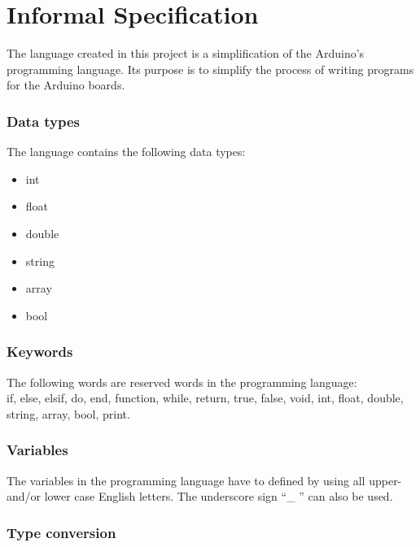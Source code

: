 \chapter{Informal Specification}\label{analysis:informal-specification}

The language created in this project is a simplification of the Arduino's programming language. Its purpose is to simplify the process of writing programs for the Arduino boards.   

\subsection{Data types}
The language contains the following data types: 
\begin{itemize}
\item int
\item float
\item double
\item string
\item array
\item bool
\end{itemize}

\subsection{Keywords}
The following words are reserved words in the programming language:\\
if, else, elsif, do, end, function, while, return, true, false, void, int, float, double, string, array, bool, print.

\subsection{Variables}
The variables in the programming language have to defined by using all upper- and/or lower case English letters. The underscore sign ``\_ '' can also be used. 

\subsection{Type conversion}
